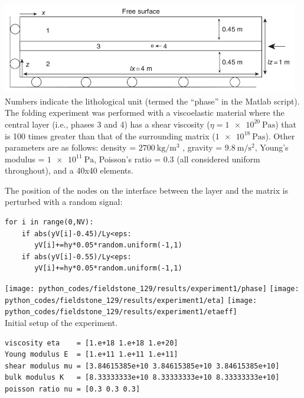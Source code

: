 \begin{center}
\includegraphics[width=13cm]{python_codes/fieldstone_129/images/simpson1}\\
{\captionfont  
Numbers indicate the lithological unit (termed the ``phase'' in the Matlab script). 
The folding experiment was
performed with a viscoelastic material where the central layer (i.e., phases 3 and 4) 
has a shear viscosity ($\eta=\SI{1e20}{\pascal\second}$) that
is 100 times greater than that of the surrounding matrix ($\SI{1e18}{\pascal\second}$). 
Other parameters are as follows: 
density = $\SI{2700}{\kg\per\cubic\meter}$ , 
gravity = $\SI{9.8}{\meter\per\square\second}$, 
Young's modulus = $\SI{1e11}{\pascal}$, 
Poisson’s ratio = 0.3 (all considered uniform throughout),
and a 40x40 elements.}
\end{center}

The position of the nodes on the interface between the layer and the matrix is 
perturbed with a random signal:
\begin{lstlisting}
for i in range(0,NV):
    if abs(yV[i]-0.45)/Ly<eps:
       yV[i]+=hy*0.05*random.uniform(-1,1)
    if abs(yV[i]-0.55)/Ly<eps:
       yV[i]+=hy*0.05*random.uniform(-1,1)
\end{lstlisting}


\begin{center}
\texttt{[image: python\_codes/fieldstone\_129/results/experiment1/phase]}
\texttt{[image: python\_codes/fieldstone\_129/results/experiment1/eta]}
\texttt{[image: python\_codes/fieldstone\_129/results/experiment1/etaeff]}\\
{\captionfont Initial setup of the experiment.}
\end{center} 

\begin{verbatim}
viscosity eta    = [1.e+18 1.e+18 1.e+20]
Young modulus E  = [1.e+11 1.e+11 1.e+11]
shear modulus mu = [3.84615385e+10 3.84615385e+10 3.84615385e+10]
bulk modulus K   = [8.33333333e+10 8.33333333e+10 8.33333333e+10]
poisson ratio nu = [0.3 0.3 0.3]
\end{verbatim}


